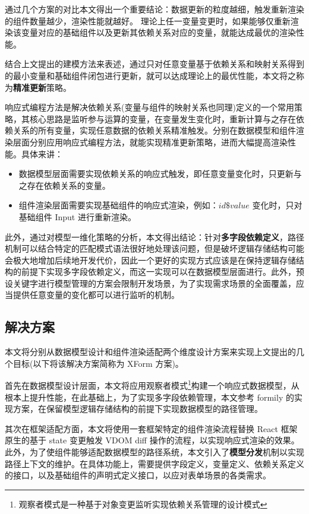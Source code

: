 \documentclass[winfonts,master,twoside]{njuthesis}
\begin{document}
通过几个方案的对比本文得出一个重要结论：数据更新的粒度越细，触发重新渲染的组件数量越少，渲染性能就越好。
理论上任一变量变更时，如果能够仅重新渲染该变量对应的基础组件以及更新其依赖关系对应的变量，就能达成最优的渲染性能。

结合上文提出的建模方法来表述，通过只对任意变量基于依赖关系和映射关系得到的最小变量和基础组件闭包进行更新，就可以达成理论上的最优性能，本文将之称为\textbf{精准更新}策略。

响应式编程方法是解决依赖关系(变量与组件的映射关系也同理)定义的一个常用策略\cite{bainomugisha2013survey}，其核心思路是监听参与运算的变量，在变量发生变化时，重新计算与之存在依赖关系的所有变量，实现任意数据的依赖关系精准触发。分别在数据模型和组件渲染层面分别应用响应式编程方法，就能实现精准更新策略，进而大幅提高渲染性能。具体来讲：

\begin{itemize}
    \item 数据模型层面需要实现依赖关系的响应式触发，即任意变量变化时，只更新与之存在依赖关系的变量。
    \item 组件渲染层面需要实现基础组件的响应式渲染，例如：$id\$value$ 变化时，只对基础组件 Input 进行重新渲染。
\end{itemize}

此外，通过对模型一维化策略的分析，本文得出结论：针对\textbf{多字段依赖定义}，路径机制可以结合特定的匹配模式语法很好地处理该问题，但是破坏逻辑存储结构可能会极大地增加后续地开发代价，因此一个更好的实现方式应该是在保持逻辑存储结构的前提下实现多字段依赖定义，而这一实现可以在数据模型层面进行。此外，预设关键字进行模型管理的方案会限制开发场景，为了实现需求场景的全面覆盖，应当提供任意变量的变化都可以进行监听的机制。

\subsection{解决方案}\label{final-solution}

本文将分别从数据模型设计和组件渲染适配两个维度设计方案来实现上文提出的几个目标(以下将该解决方案简称为 XForm 方案)。

首先在数据模型设计层面，本文将应用观察者模式\footnote{观察者模式是一种基于对象变更监听实现依赖关系管理的设计模式\cite{gamma1995design}}构建一个响应式数据模型，从根本上提升性能，在此基础上，为了实现多字段依赖管理，本文参考 formily 的实现方案，在保留模型逻辑存储结构的前提下实现数据模型的路径管理。

其次在框架适配方面，本文将使用一套框架特定的组件渲染流程替换 React 框架原生的基于 state 变更触发 VDOM diff 操作的流程，以实现响应式渲染的效果。此外，为了使组件能够适配数据模型的路径系统，本文引入了\textbf{模型分发}机制以实现路径上下文的维护。在具体功能上，需要提供字段定义，变量定义、依赖关系定义的接口，以及基础组件的声明式定义接口，以应对表单场景的各类需求。
\end{document}
